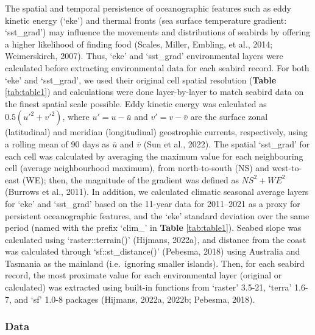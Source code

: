 \documentclass{article}
\begin{document}
\begin{linenumbers}
The spatial and temporal persistence of oceanographic features such as eddy kinetic energy (`eke') and thermal fronts (sea surface temperature gradient: `sst\_grad') may influence the movements and distributions of seabirds by offering a higher likelihood of finding food (Scales, Miller, Embling, et al., 2014; Weimerskirch, 2007). Thus, `eke' and `sst\_grad' environmental layers were calculated before extracting environmental data for each seabird record. For both `eke' and `sst\_grad', we used their original cell spatial resolution (\textbf{Table} \ref{tab:table1}) and calculations were done layer-by-layer to match seabird data on the finest spatial scale possible. Eddy kinetic energy was calculated as \(0.5 (u'^{2} + v'^{2})\), where \(u' = u - \bar{u}\) and \(v' = v - \bar{v}\) are the surface zonal (latitudinal) and meridian (longitudinal) geostrophic currents, respectively, using a rolling mean of 90 days as \(\bar{u}\) and \(\bar{v}\) (Sun et al., 2022). The spatial `sst\_grad' for each cell was calculated by averaging the maximum value for each neighbouring cell (average neighbourhood maximum), from north-to-south (NS) and west-to-east (WE); then, the magnitude of the gradient was defined as \(NS^{2} + WE^{2}\) (Burrows et al., 2011). In addition, we calculated climatic seasonal average layers for `eke' and `sst\_grad' based on the 11-year data for 2011--2021 as a proxy for persistent oceanographic features, and the `eke' standard deviation over the same period (named with the prefix `clim\_' in \textbf{Table} \ref{tab:table1}). Seabed slope was calculated using `raster::terrain()' (Hijmans, 2022a), and distance from the coast was calculated through `sf::st\_distance()' (Pebesma, 2018) using Australia and Tasmania as the mainland (i.e.~ignoring smaller islands). Then, for each seabird record, the most proximate value for each environmental layer (original or calculated) was extracted using built-in functions from `raster' 3.5-21, `terra' 1.6-7, and `sf' 1.0-8 packages (Hijmans, 2022a, 2022b; Pebesma, 2018).

\hypertarget{modellingdatasets}{%
\subsubsection{Data}\label{modellingdatasets}}

\label{sec:modellingdatasets}


\end{linenumbers}
\end{document}
